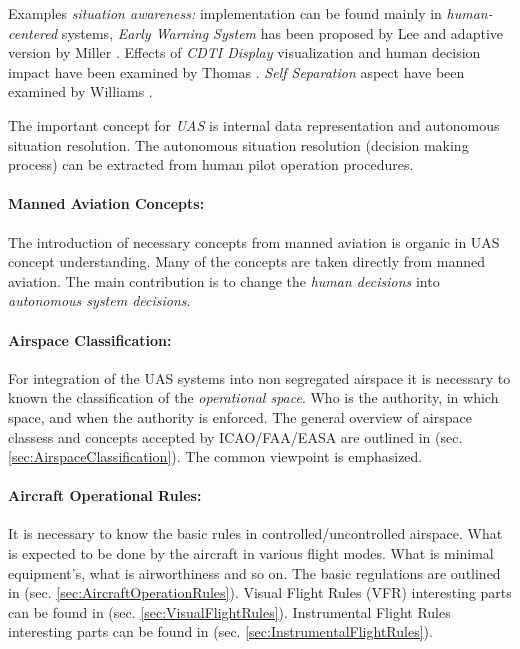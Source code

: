 Examples \emph{situation awareness:} implementation can be found mainly in \emph{human-centered} systems, \emph{Early Warning System} has been proposed by Lee \cite{lee2002collision} and adaptive version by Miller \cite{miller2002adaptive}. Effects of \emph{CDTI Display} visualization and human decision impact have been examined by Thomas \cite{thomas2005effects}. \emph{Self Separation} aspect have been examined by Williams \cite{williams1983self}.

The important concept for \emph{UAS} is internal data representation and autonomous situation resolution. The autonomous situation resolution (decision making process) can be extracted from human pilot operation procedures.  

\paragraph{Manned Aviation Concepts:} The introduction of necessary concepts from manned aviation is organic in UAS concept understanding. 
Many of the concepts are taken directly from manned aviation. The main contribution is to change the \emph{human decisions} into \emph{autonomous system decisions}.

\paragraph{Airspace Classification:} For integration of the UAS systems into non segregated airspace it is necessary to known the classification of the \emph{operational space}. Who is the authority, in which space, and when the authority is enforced. The general overview of airspace classess and concepts accepted by ICAO/FAA/EASA are outlined in (sec. \ref{sec:AirspaceClassification}). The common viewpoint is emphasized. 
    
\paragraph{Aircraft Operational Rules:} It is necessary to know the basic rules in controlled/uncontrolled airspace. What is expected to be done by the aircraft in various flight modes. What is minimal equipment's, what is airworthiness and so on. The basic regulations are outlined in (sec. \ref{sec:AircraftOperationRules}). Visual Flight Rules (VFR) interesting parts can be found in (sec. \ref{sec:VisualFlightRules}). Instrumental Flight Rules interesting parts can be found in (sec. \ref{sec:InstrumentalFlightRules}).
        
